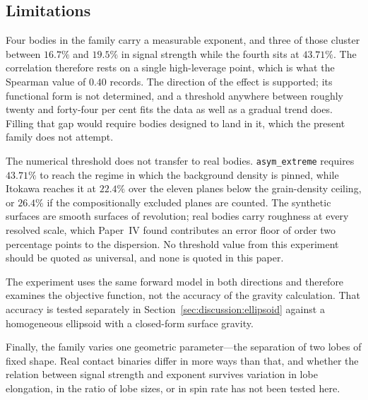 \subsection{Limitations}
\label{app:synth:limits}

Four bodies in the family carry a measurable exponent, and three of those
cluster between $16.7\%$ and $19.5\%$ in signal strength while the fourth sits
at $43.71\%$. The correlation therefore rests on a single high-leverage point,
which is what the Spearman value of $0.40$ records.
The direction of the effect is supported; its functional form is not
determined, and a threshold anywhere between roughly twenty and forty-four per
cent fits the data as well as a gradual trend does. Filling that gap would
require bodies designed to land in it, which the present family does not
attempt.

The numerical threshold does not transfer to real bodies. \texttt{asym\_extreme}
requires $43.71\%$ to reach the regime in which the background density is
pinned, while Itokawa reaches it at $22.4\%$ over the eleven planes below
the grain-density ceiling, or $26.4\%$ if the compositionally excluded
planes are counted. The synthetic surfaces are smooth surfaces of revolution; real
bodies carry roughness at every resolved scale, which Paper~IV found
contributes an error floor of order two percentage points to the dispersion. No
threshold value from this experiment should be quoted as universal, and none is
quoted in this paper.

The experiment uses the same forward model in both directions and therefore
examines the objective function, not the accuracy of the gravity calculation.
That accuracy is tested separately in
Section~\ref{sec:discussion:ellipsoid} against a homogeneous ellipsoid with a
closed-form surface gravity.

Finally, the family varies one geometric parameter---the separation of two
lobes of fixed shape. Real contact binaries differ in more ways than that, and
whether the relation between signal strength and exponent survives variation in
lobe elongation, in the ratio of lobe sizes, or in spin rate has not been
tested here.


